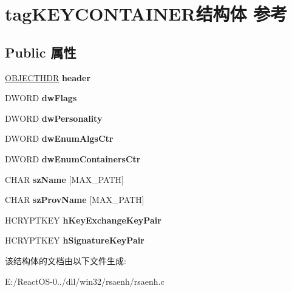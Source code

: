 \hypertarget{structtag_k_e_y_c_o_n_t_a_i_n_e_r}{}\section{tag\+K\+E\+Y\+C\+O\+N\+T\+A\+I\+N\+E\+R结构体 参考}
\label{structtag_k_e_y_c_o_n_t_a_i_n_e_r}
\subsection*{Public 属性}
\begin{DoxyCompactItemize}
\item 
\mbox{\label{structtag_k_e_y_c_o_n_t_a_i_n_e_r_a21a110a751a0fc6c21261942fbc0bdce}} 
\hyperlink{structtag_o_b_j_e_c_t_h_d_r}{O\+B\+J\+E\+C\+T\+H\+DR} {\bfseries header}
\item 
\mbox{\label{structtag_k_e_y_c_o_n_t_a_i_n_e_r_aa157a2a7bde483ec73c35c6b8c275096}} 
D\+W\+O\+RD {\bfseries dw\+Flags}
\item 
\mbox{\label{structtag_k_e_y_c_o_n_t_a_i_n_e_r_aba834c962c383e75f2b139c8956eede0}} 
D\+W\+O\+RD {\bfseries dw\+Personality}
\item 
\mbox{\label{structtag_k_e_y_c_o_n_t_a_i_n_e_r_a5bc9f6df242428abee11ae38d3655c19}} 
D\+W\+O\+RD {\bfseries dw\+Enum\+Algs\+Ctr}
\item 
\mbox{\label{structtag_k_e_y_c_o_n_t_a_i_n_e_r_af6e2cd9006fde8af22a88bd0a0d20fa4}} 
D\+W\+O\+RD {\bfseries dw\+Enum\+Containers\+Ctr}
\item 
\mbox{\label{structtag_k_e_y_c_o_n_t_a_i_n_e_r_a3650980eccaae69db0e17751906a70fc}} 
C\+H\+AR {\bfseries sz\+Name} \mbox{[}M\+A\+X\+\_\+\+P\+A\+TH\mbox{]}
\item 
\mbox{\label{structtag_k_e_y_c_o_n_t_a_i_n_e_r_a79a5d1d9a53e041fa6b558dd5c18e9ef}} 
C\+H\+AR {\bfseries sz\+Prov\+Name} \mbox{[}M\+A\+X\+\_\+\+P\+A\+TH\mbox{]}
\item 
\mbox{\label{structtag_k_e_y_c_o_n_t_a_i_n_e_r_ad8871cade21295f2561b068307a5a950}} 
H\+C\+R\+Y\+P\+T\+K\+EY {\bfseries h\+Key\+Exchange\+Key\+Pair}
\item 
\mbox{\label{structtag_k_e_y_c_o_n_t_a_i_n_e_r_abdeae7167bd52ee923d71085d0c7633a}} 
H\+C\+R\+Y\+P\+T\+K\+EY {\bfseries h\+Signature\+Key\+Pair}
\end{DoxyCompactItemize}


该结构体的文档由以下文件生成\+:\begin{DoxyCompactItemize}
\item 
E\+:/\+React\+O\+S-\/0../dll/win32/rsaenh/rsaenh.\+c\end{DoxyCompactItemize}
